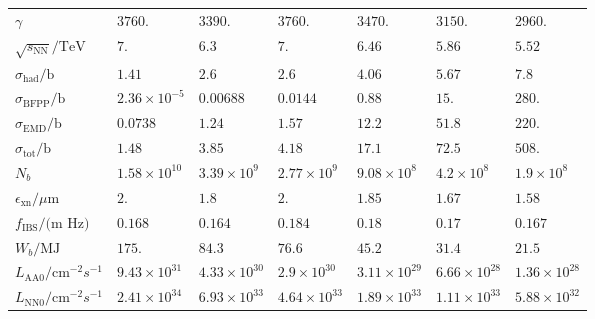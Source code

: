 \begin{tabular}{|*{1}{*{7}{|l}|}|}
$\gamma$                                                                       &    \(3760.\) & \(3390.\) & \(3760.\) & \(3470.\) & \(3150.\) & \(2960.\) \\
$\sqrt{s_{\text{NN}}}\text{/TeV}$                                              &    \(7.\) & \(6.3\) & \(7.\) & \(6.46\) & \(5.86\) & \(5.52\) \\
$\sigma _{\text{had}}\text{/b}$                                                &    \(1.41\) & \(2.6\) & \(2.6\) & \(4.06\) & \(5.67\) & \(7.8\) \\
$\sigma _{\text{BFPP}}\text{/b}$                                               &    \(2.36\times 10^{-5}\) & \(0.00688\) & \(0.0144\) & \(0.88\) & \(15.\)& \(280.\) \\
$\sigma _{\text{EMD}}\text{/b}$                                                &    \(0.0738\) & \(1.24\) & \(1.57\) & \(12.2\) & \(51.8\) & \(220.\) \\
$\sigma _{\text{tot}}\text{/b}$                                                &    \(1.48\) & \(3.85\) & \(4.18\) & \(17.1\) & \(72.5\) & \(508.\) \\
$N_b$                                                                          &    \(1.58\times 10^{10}\) & \(3.39\times 10^9\) & \(2.77\times 10^9\) & \(9.08\times 10^8\) & \(4.2\times 10^8\) & \(1.9\times 10^8\) \\
$\epsilon _{\text{xn}}\text{/$\mu $m}$                                         &    \(2.\) & \(1.8\) & \(2.\) & \(1.85\) & \(1.67\) & \(1.58\) \\
$f_{\text{IBS}}\text{/(m Hz)}$                                                 &    \(0.168\) & \(0.164\) & \(0.184\) & \(0.18\) & \(0.17\) & \(0.167\) \\
$W_b\text{/MJ}$                                                                &    \(175.\) & \(84.3\) & \(76.6\) & \(45.2\) & \(31.4\) & \(21.5\) \\
$L_{\text{AA0}}/\text{cm}^{-2}s^{-1}$                                          &    \(9.43\times 10^{31}\) & \(4.33\times 10^{30}\) & \(2.9\times 10^{30}\) & \(3.11\times 10^{29}\) & \(6.66\times 10^{28}\) & \(1.36\times 10^{28}\) \\
$L_{\text{NN0}}/\text{cm}^{-2}s^{-1}$                                          &    \(2.41\times 10^{34}\) & \(6.93\times 10^{33}\) & \(4.64\times 10^{33}\) & \(1.89\times 10^{33}\) & \(1.11\times 10^{33}\) & \(5.88\times 10^{32}\) \\

\end{tabular}
